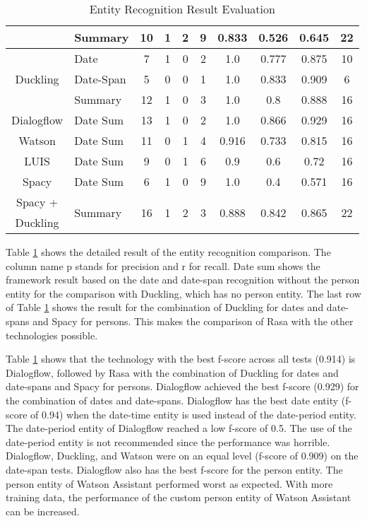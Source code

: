 \begin{table}[h]
\begin{tabular}{ c | l | c | c | c | c | c | c | c | c }
        & Summary & 10 & 1 & 2 & 9 & 0.833 & 0.526 & 0.645 & 22 \\ \hline
        \multirow{3}{*}{Duckling} 
        & Date & 7 & 1 & 0 & 2 & 1.0 & 0.777 & 0.875 & 10 \\ 
        & Date-Span & 5 & 0 & 0 & 1 & 1.0 & 0.833 & 0.909 & 6 \\ \cline{2-10}
        & Summary & 12 & 1 & 0 & 3 & 1.0 & 0.8 & 0.888 & 16 \\ \hline
        Dialogflow & Date Sum & 13 & 1 & 0 & 2 & 1.0 & 0.866 & 0.929 & 16 \\ \hline
        Watson & Date Sum & 11 & 0 & 1 & 4 & 0.916 & 0.733 & 0.815 & 16 \\ \hline
        LUIS & Date Sum & 9 & 0 & 1 & 6 & 0.9 & 0.6 & 0.72 & 16 \\ \hline
        Spacy & Date Sum & 6 & 1 & 0 & 9 & 1.0 & 0.4 & 0.571 & 16 \\ \hline
        Spacy + & \multirow{2}{*}{Summary} & \multirow{2}{*}{16} & \multirow{2}{*}{1} & \multirow{2}{*}{2} & \multirow{2}{*}{3} & \multirow{2}{*}{0.888} & \multirow{2}{*}{0.842} & \multirow{2}{*}{0.865} & \multirow{2}{*}{22} \\
        Duckling & & & & & & & & & \\
    \end{tabular}
    \caption{Entity Recognition Result Evaluation} \label{tab:entity_extraction_eval}
\end{table} \noindent
Table \ref{tab:entity_extraction_eval} shows the detailed result of the entity recognition comparison.
The column name p stands for precision and r for recall.
Date sum shows the framework result based on the date and date-span recognition without the person entity for the comparison with Duckling, which has no person entity.
The last row of Table \ref{tab:entity_extraction_eval} shows the result for the combination of Duckling for dates and date-spans and Spacy for persons.
This makes the comparison of Rasa with the other technologies possible.

Table \ref{tab:entity_extraction_eval} shows that the technology with the best f-score across all tests (0.914) is Dialogflow, followed by Rasa with the combination of Duckling for dates and date-spans and Spacy for persons.
Dialogflow achieved the best f-score (0.929) for the combination of dates and date-spans.
Dialogflow has the best date entity (f-score of 0.94) when the date-time entity is used instead of the date-period entity.
The date-period entity of Dialogflow reached a low f-score of 0.5.
The use of the date-period entity is not recommended since the performance was horrible.
Dialogflow, Duckling, and Watson were on an equal level (f-score of 0.909) on the date-span tests.
Dialogflow also has the best f-score for the person entity.
The person entity of Watson Assistant performed worst as expected.
With more training data, the performance of the custom person entity of Watson Assistant can be increased.

